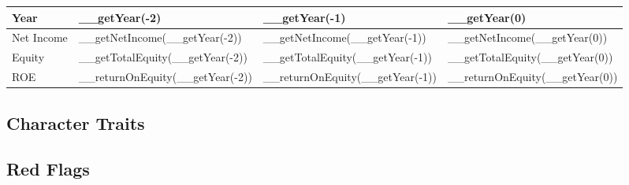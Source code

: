\begin{tabularx}{\textwidth}{|X|X|X|X|}
 \hline
 Year                     & __getYear(-2)                   & __getYear(-1)                   & __getYear(0)                   \\
 \hline
 Net Income               & __getNetIncome(__getYear(-2))   & __getNetIncome(__getYear(-1))   & __getNetIncome(__getYear(0))   \\
 Equity                   & __getTotalEquity(__getYear(-2)) & __getTotalEquity(__getYear(-1)) & __getTotalEquity(__getYear(0)) \\
 \rowcolor{lightgray} ROE & __returnOnEquity(__getYear(-2)) & __returnOnEquity(__getYear(-1)) & __returnOnEquity(__getYear(0)) \\
 \hline
\end{tabularx}

\subsection{Character Traits}

\subsection{Red Flags}
